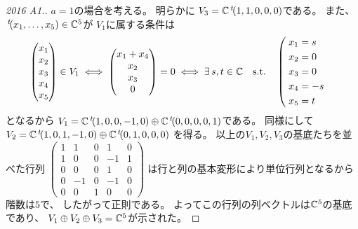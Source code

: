 \documentclass[report]{jlreq}
\begin{document}
\begin{proof}[2016 A1.]
    $a = 1$の場合を考える。
    明らかに
    $V_3 = \mathbb{C} \,{}^{t}\!(1, 1, 0, 0, 0)$である。
    また、$\,{}^{t}\!(x_1, \dots, x_5) \in \mathbb{C}^5$が
    $V_1$に属する条件は
    \begin{alignat}{1}
        \begin{pmatrix}
            x_1 \\ x_2 \\ x_3 \\ x_4 \\ x_5
        \end{pmatrix}
            \in V_1
            &\iff
                \begin{pmatrix}
                    x_1 + x_4 \\
                    x_2 \\
                    x_3 \\
                    0
                \end{pmatrix}
                = 0
            \iff
                \exists \, s, t \in \mathbb{C}
                \quad \text{s.t.} \quad
                \left(
                    \;
                    \begin{aligned}
                        x_1 &= s \\
                        x_2 &= 0 \\
                        x_3 &= 0 \\
                        x_4 &= -s \\
                        x_5 &= t
                    \end{aligned}
                \right.
    \end{alignat}
    となるから
    $V_1 = \mathbb{C} \,{}^{t}\!(1, 0, 0, -1, 0) \oplus \mathbb{C} \,{}^{t}\!(0, 0, 0, 0, 1)$である。
    同様にして
    $V_2 = \mathbb{C} \,{}^{t}\!(1, 0, 1, -1, 0) \oplus \mathbb{C} \,{}^{t}\!(0, 1, 0, 0, 0)$
    を得る。
    以上の$V_1, V_2, V_3$の基底たちを並べた行列
    $\begin{pmatrix}
        1 & 1 & 0 & 1 & 0 \\
        1 & 0 & 0 & -1 & 1 \\
        0 & 0 & 0 & 1 & 0 \\
        0 & -1 & 0 & -1 & 0 \\
        0 & 0 & 1 & 0 & 0
    \end{pmatrix}$
    は行と列の基本変形により単位行列となるから階数は$5$で、
    したがって正則である。
    よってこの行列の列ベクトルは$\mathbb{C}^5$の基底であり、
    $V_1 \oplus V_2 \oplus V_3 = \mathbb{C}^5$が示された。
\end{proof}
\end{document}
